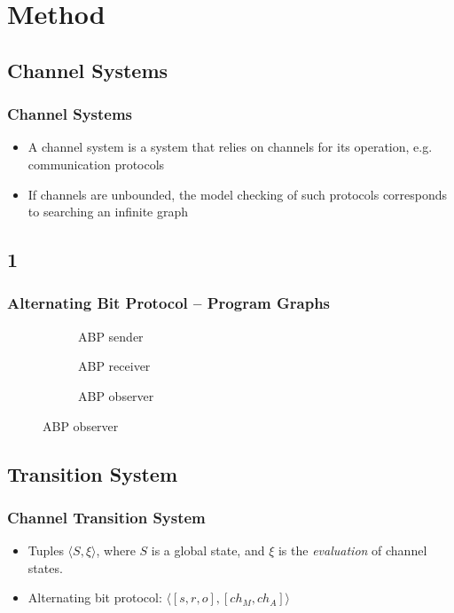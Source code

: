 \documentclass[handout]{beamer}
\begin{document}
\begin{frame}
  \tableofcontents
\end{frame}


\section{Method}
\subsection{Channel Systems}
\begin{frame}
  \frametitle{Channel Systems}
  \begin{itemize}
  \item
    A channel system is a system that relies on channels for its operation, e.g. communication protocols
  \item
    If channels are unbounded, the model checking of such protocols corresponds to searching an infinite graph
  \end{itemize}
\end{frame}

\subsection*{1}
\begin{frame}
  \begin{example}
    \frametitle{Alternating Bit Protocol -- Program Graphs}
    \begin{figure}
      \begin{subfigure}[b]{0.49\textwidth}
        \abpsender
        \caption{\tiny ABP sender}
      \end{subfigure}
      \begin{subfigure}[b]{0.49\textwidth}
        \abpreceiver
        \caption{\tiny ABP receiver}
      \end{subfigure}
      \begin{subfigure}[b]{\textwidth}
        \center
        \abpobserver
        \caption{\tiny ABP observer}
      \end{subfigure}
    \end{figure}
  \end{example}
\end{frame}

\subsection{Transition System}
\begin{frame}
  \frametitle{Channel Transition System}
  \begin{itemize}
  \item
    Tuples $\langle S, \xi\rangle$, where $S$ is a global state, and $\xi$ is the \emph{evaluation} of channel states.
  \item
    Alternating bit protocol: $\langle [s, r, o], [ch_M, ch_A]\rangle$
  \end{itemize}
\end{frame}
\end{document}
